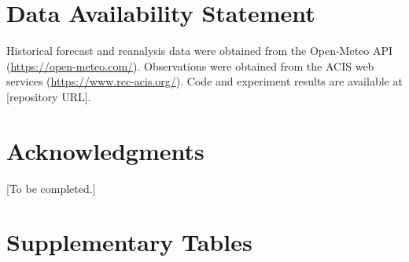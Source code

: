 \documentclass[12pt, letterpaper]{article}
\begin{document}

\section*{Data Availability Statement}

Historical forecast and reanalysis data were obtained from the Open-Meteo API
(\url{https://open-meteo.com/}). Observations were obtained from the ACIS web
services (\url{https://www.rcc-acis.org/}). Code and experiment results are
available at [repository URL].

\section*{Acknowledgments}

[To be completed.]


\appendix
\section{Supplementary Tables}




\end{document}
